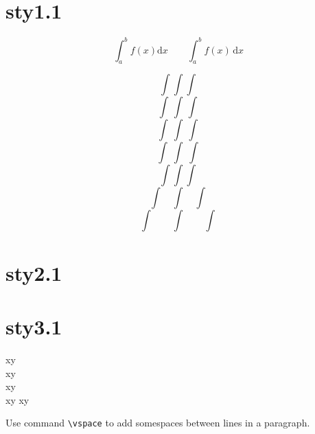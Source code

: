 \documentclass{article}
\begin{document}
\section{sty1.1}%

  \[
\int_a^b f(x)\mathrm{d}x
\qquad
\int_a^b f(x)\,\mathrm{d}x
\]

  $$\int\int\int$$
  $$\int\,\int\,\int$$
  $$\int\:\int\:\int$$
  $$\int\;\int\;\int$$
  $$\int\!\int\!\int$$
  $$\int\quad\int\quad\int$$
  $$\int\qquad\int\qquad\int$$



\section{sty2.1}%
\lipsum[1]
\setlength{\parskip}{1ex plus 0.5ex minus 0.2ex}
\setlength{\leftskip}{20pt}\setlength{\rightskip}{20pt}
\lipsum[1]

\noindent
\lipsum[2]

\setlength{\parindent}{2em}
\lipsum[2]
\noindent


\section{sty3.1}%
x\hspace{1em}y\\
x\quad y\\
xy\\
x\hspace{\fill}y
x\hspace{1.5cm}y

Use command \verb|\vspace| to
add somespaces  \vspace{12pt}
between lines in a paragraph.
\end{document}
